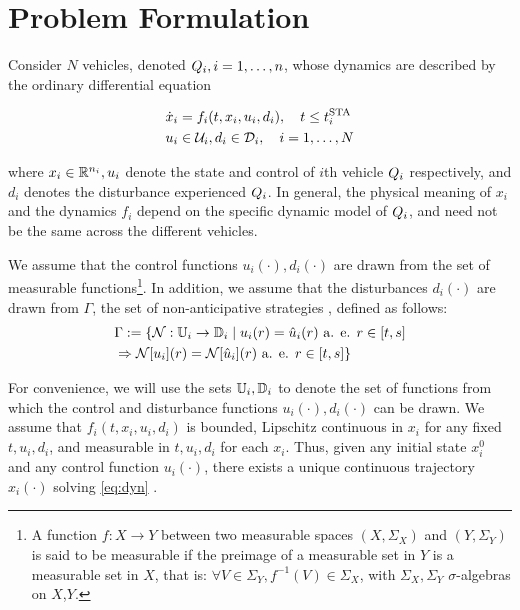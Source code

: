 \section{Problem Formulation \label{sec:formulation}}
Consider $N$ vehicles, denoted $Q_i, i = 1,\ldots,n$, whose dynamics are described by the ordinary differential equation

\begin{equation}
\label{eq:dyn}
\begin{aligned}
\dot{x}_i &= f_i(t, x_i, u_i, d_i), \quad t \le t^\text{STA}_i \\
u_i &\in \mathcal{U}_i, d_i \in \mathcal{D}_i, \quad i = 1,\ldots, N
\end{aligned}
\end{equation}

\noindent where $x_i \in \mathbb{R}^{n_i}, u_i$ denote the state and control of $i$th vehicle $Q_i$ respectively, and $d_i$ denotes the disturbance experienced $Q_i$. In general, the physical meaning of $x_i$ and the dynamics $f_i$ depend on the specific dynamic model of $Q_i$, and need not be the same across the different vehicles.

We assume that the control functions $u_i(\cdot), d_i(\cdot)$ are drawn from the set of measurable functions\footnote{
A function $f:X\to Y$ between two measurable spaces $(X,\Sigma_X)$ and $(Y,\Sigma_Y)$ is said to be measurable if the preimage of a measurable set in $Y$ is a measurable set in $X$, that is: $\forall V\in\Sigma_Y, f^{-1}(V)\in\Sigma_X$, with $\Sigma_X,\Sigma_Y$ $\sigma$-algebras on $X$,$Y$.}. In addition, we assume that the disturbances $d_i(\cdot)$ are drawn from $\Gamma$, the set of non-anticipative strategies \cite{Mitchell05}, defined as follows:
\begin{equation}
\begin{aligned}
& \Gamma := \{\mathcal{N}: \mathbb{U}_i \rightarrow \mathbb{D}_i \mid  u_i(r) = \hat{u}_i(r) \text{ a. e. } r\in[t,s] \\
& \Rightarrow \mathcal{N}[u_i](r) = \mathcal{N}[\hat{u}_i](r) \text{ a. e. } r\in[t,s]\}
\end{aligned}
\end{equation}

For convenience, we will use the sets $\mathbb{U}_i, \mathbb{D}_i$ to denote the set of functions from which the control and disturbance functions $u_i(\cdot), d_i(\cdot)$ can be drawn. We assume that $f_i(t,x_i, u_i, d_i)$ is bounded, Lipschitz continuous in $x_i$ for any fixed $t, u_i, d_i$, and measurable in $t, u_i, d_i$ for each $x_i$. Thus, given any initial state $x_i^0$ and any control function $u_i(\cdot)$, there exists a unique continuous trajectory $x_i(\cdot)$ solving \eqref{eq:dyn} \cite{Coddington55}.

